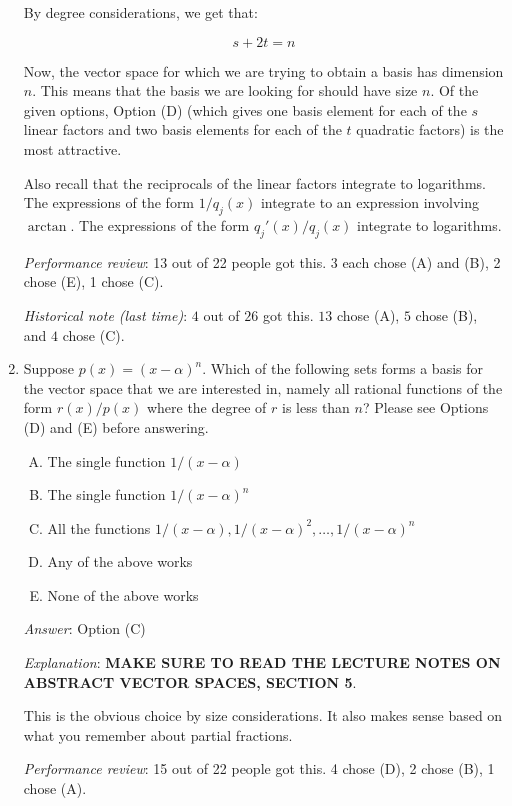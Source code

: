 \documentclass[10pt]{amsart}
\begin{document}
\begin{enumerate}
  By degree considerations, we get that:

  $$s + 2t = n$$

  Now, the vector space for which we are trying to obtain a basis has
  dimension $n$. This means that the basis we are looking for should
  have size $n$. Of the given options, Option (D) (which gives one
  basis element for each of the $s$ linear factors and two basis
  elements for each of the $t$ quadratic factors) is the most
  attractive.

  Also recall that the reciprocals of the linear factors integrate to
  logarithms. The expressions of the form $1/q_j(x)$ integrate to an
  expression involving $\arctan$. The expressions of the form
  $q_j'(x)/q_j(x)$ integrate to logarithms.

  {\em Performance review}: 13 out of 22 people got this. 3 each chose
  (A) and (B), 2 chose (E), 1 chose (C).

  {\em Historical note (last time)}: $4$ out of $26$ got this. $13$ chose (A),
  $5$ chose (B), and $4$ chose (C).

\item Suppose $p(x) = (x - \alpha)^n$. Which of the following sets
  forms a basis for the vector space that we are interested in, namely
  all rational functions of the form $r(x)/p(x)$ where the degree of
  $r$ is less than $n$? Please see Options (D) and (E) before
  answering.

  \begin{enumerate}[(A)]
  \item The single function $1/(x - \alpha)$
  \item The single function $1/(x - \alpha)^n$
  \item All the functions $1/(x - \alpha), 1/(x - \alpha)^2, \dots, 1/(x - \alpha)^n$
  \item Any of the above works
  \item None of the above works
  \end{enumerate}

  {\em Answer}: Option (C)

  {\em Explanation}: {\bf MAKE SURE TO READ THE LECTURE NOTES ON ABSTRACT VECTOR SPACES, SECTION 5}.

  This is the obvious choice by size considerations. It also makes
  sense based on what you remember about partial fractions.

  {\em Performance review}: 15 out of 22 people got this. 4 chose (D),
  2 chose (B), 1 chose (A).


\end{enumerate}
\end{document}
